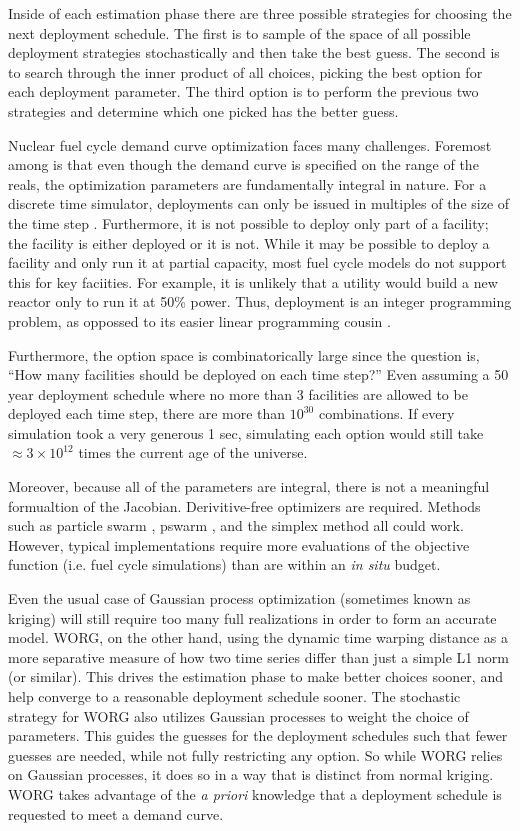 Inside of each estimation phase there are three possible strategies for 
choosing the next deployment schedule.  The first is to sample of the 
space of all possible deployment strategies stochastically and then take the 
best guess.  The second is to search through the inner product of all choices,
picking the best option for each deployment parameter. The third option 
is to perform the previous two strategies and determine which one picked
has the better guess.

Nuclear fuel cycle demand curve optimization faces many challenges. 
Foremost among is that even though the demand curve is specified on the 
range of the reals, the optimization parameters are fundamentally 
integral in nature. For a discrete time simulator, deployments can only 
be issued in multiples of the size of the time step \citeme. Furthermore, 
it is not possible to deploy only part of a facility; the facility is either 
deployed or it is not. While it may be possible to deploy a facility and 
only run it at partial capacity, most fuel cycle models do not support this
for key faciities.  For example, it is unlikely that a utility would build 
a new reactor only to run it at 50\% power. Thus, deployment is an integer 
programming problem, as oppossed to its easier linear programming cousin
\citeme.

Furthermore, the option space is combinatorically large since the 
question is, ``How many facilities should be deployed on each time step?'' 
Even assuming a 50 year deployment schedule where no more than 3 facilities 
are allowed to be deployed each time step, there are more than $10^30$ 
combinations. If every simulation took a very generous 1 sec, simulating 
each option would still take $\approx 3\times10^12$ times the current age
of the universe.

Moreover, because all of the parameters are integral, there is not a 
meaningful formualtion of the Jacobian. Derivitive-free optimizers are 
required. Methods such as particle swarm \citeme, pswarm \citeme, and the 
simplex method all could work.  However, typical implementations require
more evaluations of the objective function (i.e. fuel cycle simulations)
than are within an \emph{in situ} budget. 

Even the usual case of 
Gaussian process optimization (sometimes known as kriging) will still 
require too many full realizations in order to form an accurate model.
WORG, on the other hand, using the dynamic time warping distance as a 
more separative measure of how two time series differ than just a simple
L1 norm (or similar). This drives the estimation phase to make better choices
sooner, and help converge to a reasonable deployment schedule sooner. 
The stochastic strategy for WORG also utilizes Gaussian processes to 
weight the choice of parameters.  This guides the guesses for the deployment
schedules such that fewer guesses are needed, while not fully restricting 
any option.  So while WORG relies on Gaussian processes, it does so in a way
that is distinct from normal kriging. WORG
takes advantage of the \emph{a priori} knowledge that a deployment 
schedule is requested to meet a demand curve. 

